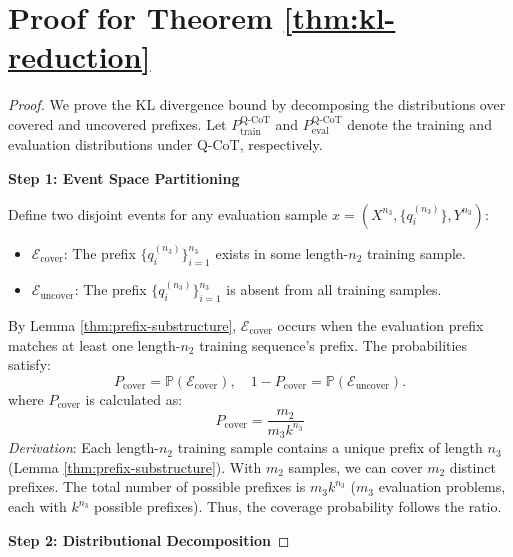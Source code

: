 \section{Proof for Theorem \ref{thm:kl-reduction}}


\begin{proof}
We prove the KL divergence bound by decomposing the distributions over covered and uncovered prefixes. Let $P_{\text{train}}^{\text{Q-CoT}}$ and $P_{\text{eval}}^{\text{Q-CoT}}$ denote the training and evaluation distributions under Q-CoT, respectively. 

\vspace{0.5em}

\noindent \textbf{Step 1: Event Space Partitioning}

Define two disjoint events for any evaluation sample $x = (X^{n_3}, \{q_i^{(n_3)}\}, Y^{n_3})$:
\begin{itemize}
    \item $\mathcal{E}_{\text{cover}}$: The prefix $\{q_i^{(n_3)}\}_{i=1}^{n_3}$ exists in some length-$n_2$ training sample.
    \item $\mathcal{E}_{\text{uncover}}$: The prefix $\{q_i^{(n_3)}\}_{i=1}^{n_3}$ is absent from all training samples.
\end{itemize}
By Lemma \ref{thm:prefix-substructure}, $\mathcal{E}_{\text{cover}}$ occurs when the evaluation prefix matches at least one length-$n_2$ training sequence's prefix. The probabilities satisfy:
\[
P_{\text{cover}} = \mathbb{P}(\mathcal{E}_{\text{cover}}), \quad 1 - P_{\text{cover}} = \mathbb{P}(\mathcal{E}_{\text{uncover}}).
\]
where $P_{\text{cover}}$ is calculated as:
\[
P_{\text{cover}} = \frac{m_2}{m_3 k^{n_3}}
\]
\textit{Derivation}: Each length-$n_2$ training sample contains a unique prefix of length $n_3$ (Lemma \ref{thm:prefix-substructure}). With $m_2$ samples, we can cover $m_2$ distinct prefixes. The total number of possible prefixes is $m_3 k^{n_3}$ ($m_3$ evaluation problems, each with $k^{n_3}$ possible prefixes). Thus, the coverage probability follows the ratio.

\vspace{0.5em}

\noindent \textbf{Step 2: Distributional Decomposition}


\end{proof}
